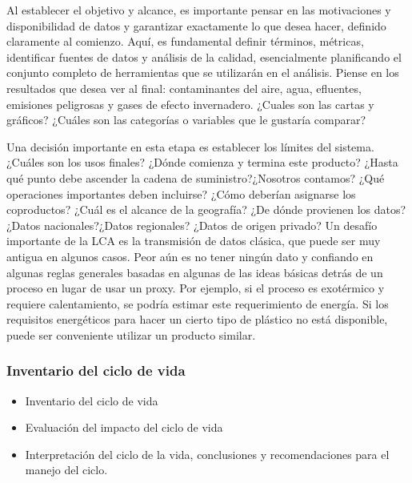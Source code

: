 \documentclass[runningheads]{llncs}
\begin{document}
\bigskip
Al establecer el objetivo y alcance, es importante pensar en las motivaciones y disponibilidad de datos y garantizar exactamente lo que desea hacer, definido claramente al comienzo. Aquí, es fundamental definir términos, métricas, identificar fuentes de datos y análisis de la calidad, esencialmente planificando el conjunto completo de herramientas que se utilizarán en el análisis. Piense en los resultados que desea ver al final: contaminantes del aire, agua, efluentes, emisiones peligrosas y gases de efecto invernadero. ¿Cuales son las cartas y gráficos? ¿Cuáles son las categorías o variables que le gustaría comparar?

\bigskip
Una decisión importante en esta etapa es establecer los límites del sistema. ¿Cuáles son los usos finales? ¿Dónde comienza y termina este producto? ¿Hasta qué punto debe ascender la cadena de suministro?¿Nosotros contamos? ¿Qué operaciones importantes deben incluirse? ¿Cómo deberían asignarse los coproductos? ¿Cuál es el alcance de la geografía? ¿De dónde provienen los datos? ¿Datos nacionales?¿Datos regionales? ¿Datos de origen privado? Un desafío importante de la LCA es la transmisión de datos clásica, que puede ser muy antigua en algunos casos. Peor aún es no tener ningún dato y confiando en algunas reglas generales basadas en algunas de las ideas básicas detrás de un proceso en lugar de usar un proxy. Por ejemplo, si el proceso es exotérmico y requiere calentamiento, se podría estimar este requerimiento de energía. Si los requisitos energéticos para hacer un cierto tipo de plástico no está disponible, puede ser conveniente utilizar un producto similar.

\subsubsection{Inventario del ciclo de vida}
\begin{itemize}
    \item Inventario del ciclo de vida
    \item Evaluación del impacto del ciclo de vida
    \item Interpretación del ciclo de la vida, conclusiones y recomendaciones para el manejo del ciclo.
\end{itemize}
\end{document}
